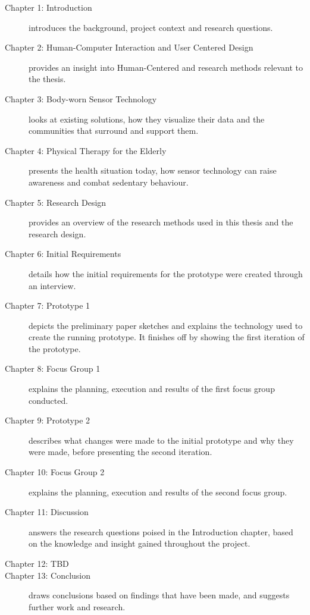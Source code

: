 \begin{description}
  \item[Chapter 1: Introduction] introduces the background, project context and research questions.
  \item[Chapter 2: Human-Computer Interaction and User Centered Design] provides an insight into Human-Centered and research methods relevant to the thesis.
  \item[Chapter 3: Body-worn Sensor Technology] looks at existing solutions, how they visualize their data and the communities that surround and support them.
  \item[Chapter 4: Physical Therapy for the Elderly] presents the health situation today, how sensor technology can raise awareness and combat sedentary behaviour.
  \item[Chapter 5: Research Design] provides an overview of the research methods used in this thesis and the research design.
  \item[Chapter 6: Initial Requirements] details how the initial requirements for the prototype were created through an interview.
  \item[Chapter 7: Prototype 1] depicts the preliminary paper sketches and explains the technology used to create the running prototype. It finishes off by showing the first iteration of the prototype.
  \item[Chapter 8: Focus Group 1] explains the planning, execution and results of the first focus group conducted.
  \item[Chapter 9: Prototype 2] describes what changes were made to the initial prototype and why they were made, before presenting the second iteration.
  \item[Chapter 10: Focus Group 2] explains the planning, execution and results of the second focus group.
  \item[Chapter 11: Discussion] answers the research questions poised in the Introduction chapter, based on the knowledge and insight gained throughout the project.
  \item[Chapter 12: TBD]
  \item[Chapter 13: Conclusion] draws conclusions based on findings that have been made, and suggests further work and research.
\end{description}

